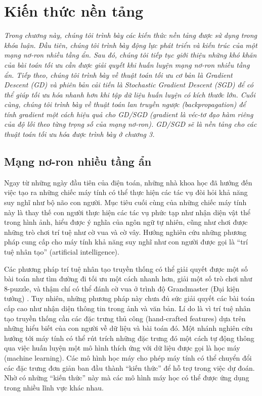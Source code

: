 \chapter{Kiến thức nền tảng}
\label{Chapter2}

\textit{Trong chương này, chúng tôi trình bày các kiến thức nền tảng được sử dụng trong khóa luận. Đầu tiên, chúng tôi trình bày động lực phát triển và kiến trúc của một mạng nơ-ron nhiều tầng ẩn. Sau đó, chúng tôi tiếp tục giới thiệu những khó khăn của bài toán tối ưu cần được giải quyết khi huấn luyện mạng nơ-ron nhiều tầng ẩn. Tiếp theo, chúng tôi trình bày về thuật toán tối ưu cơ bản là Gradient Descent (GD) và phiên bản cải tiến là Stochastic Gradient Descent (SGD) để có thể giúp tối ưu hóa nhanh hơn khi tập dữ liệu huấn luyện có kích thước lớn. Cuối cùng, chúng tôi trình bày về thuật toán lan truyền ngược (backpropagation) để tính gradient một cách hiệu quả cho GD/SGD (gradient là véc-tơ đạo hàm riêng của độ lỗi theo từng trọng số của mạng nơ-ron). GD/SGD sẽ là nền tảng cho các thuật toán tối ưu hóa được trình bày ở chương 3.}

\section{Mạng nơ-ron nhiều tầng ẩn}

Ngay từ những ngày đầu tiên của điện toán, những nhà khoa học đã hướng đến việc tạo ra những chiếc máy tính có thể thực hiện các tác vụ đòi hỏi khả năng suy nghĩ như bộ não con người. Mục tiêu cuối cùng của những chiếc máy tính này là thay thế con người thực hiện các tác vụ phức tạp như nhận diện vật thể trong hình ảnh, hiểu được ý nghĩa của ngôn ngữ tự nhiên, cũng như chơi được những trò chơi trí tuệ như cờ vua và cờ vây. Hướng nghiên cứu những phương pháp cung cấp cho máy tính khả năng suy nghĩ như con người được gọi là ``trí tuệ nhân tạo'' (artificial intelligence).

Các phương pháp trí tuệ nhân tạo truyền thống có thể giải quyết được một số bài toán như tìm đường đi tối ưu một cách nhanh hơn, giải một số trò chơi như 8-puzzle, và thậm chí có thể đánh cờ vua ở trình độ Grandmaster (Đại kiện tướng) \cite{campbell2001deepblue}. Tuy nhiên, những phương pháp này chưa đủ sức giải quyết các bài toán cấp cao như nhận diện thông tin trong ảnh và văn bản. Lí do là vì trí tuệ nhân tạo truyền thống cần các đặc trưng thủ công (hand-crafted features) dựa trên những hiểu biết của con người về dữ liệu và bài toán đó. Một nhánh nghiên cứu hướng tới máy tính có thể rút trích những đặc trưng đó một cách tự động thông qua việc huấn luyện một mô hình thích ứng với dữ liệu được gọi là học máy (machine learning). Các mô hình học máy cho phép máy tính có thể chuyển đổi các đặc trưng đơn giản ban đầu thành ``kiến thức'' để hỗ trợ trong việc dự đoán. Nhờ có những ``kiến thức'' này mà các mô hình máy học có thể được ứng dụng trong nhiều lĩnh vực khác nhau.

